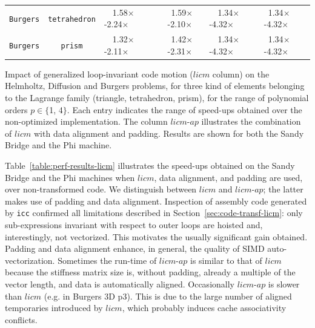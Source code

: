\documentclass[conference]{IEEEtran}
\begin{document}
{\begin{tabularx}{1.0\textwidth}{p{3.5cm}p{3.5cm}|p{2.25cm}p{2.25cm}p{2.25cm}p{2.25cm}|}
\multicolumn{1}{|c|}{\texttt{Burgers}} & \multicolumn{1}{c|}{\texttt{tetrahedron}} & ~~1.58$\times$-2.24$\times$ & \multicolumn{1}{c|}{~1.59$\times$-2.10$\times$} & ~~1.34$\times$-4.32$\times$ & ~1.34$\times$-4.32$\times$ \\
\multicolumn{1}{|c|}{\texttt{Burgers}} & \multicolumn{1}{c|}{\texttt{prism}} & ~~1.32$\times$-2.11$\times$ & \multicolumn{1}{c|}{~1.42$\times$-2.31$\times$} & ~~1.34$\times$-4.32$\times$ & ~1.34$\times$-4.32$\times$ \\
\cline{1-6}
\end{tabularx}
}

\begin{table}[t]\normalsize
\massmatrixtwodresultsnorms
\label{table:perf-results-licm}
\caption{Impact of generalized loop-invariant code motion ($licm$ column) on the Helmholtz, Diffusion and Burgers problems, for three kind of elements belonging to the Lagrange family (triangle, tetrahedron, prism), for the range of polynomial orders $p \in \lbrace$1, 4$\rbrace$. Each entry indicates the range of speed-ups obtained over the non-optimized implementation. The column $licm$-$ap$ illustrates the combination of $licm$ with data alignment and padding. Results are shown for both the Sandy Bridge and the Phi machine.}
\end{table}

Table~\ref{table:perf-results-licm} illustrates the speed-ups obtained on the Sandy Bridge and the Phi machines when $licm$, data alignment, and padding are used, over non-transformed code. We distinguish between $licm$ and $licm$-$ap$; the latter makes use of padding and data alignment. Inspection of assembly code generated by \texttt{icc} confirmed all limitations described in Section~\ref{sec:code-transf-licm}: only sub-expressions invariant with respect to outer loops are hoisted and, interestingly, not vectorized. This motivates the usually significant gain obtained. Padding and data alignment enhance, in general, the quality of SIMD auto-vectorization. Sometimes the run-time of $licm$-$ap$ is similar to that of $licm$ because the stiffness matrix size is, without padding, already a multiple of the vector length, and data is automatically aligned. Occasionally $licm$-$ap$ is slower than $licm$ (e.g. in Burgers 3D p3). This is due to the large number of aligned temporaries introduced by $licm$, which probably induces cache associativity conflicts.
\end{document}
